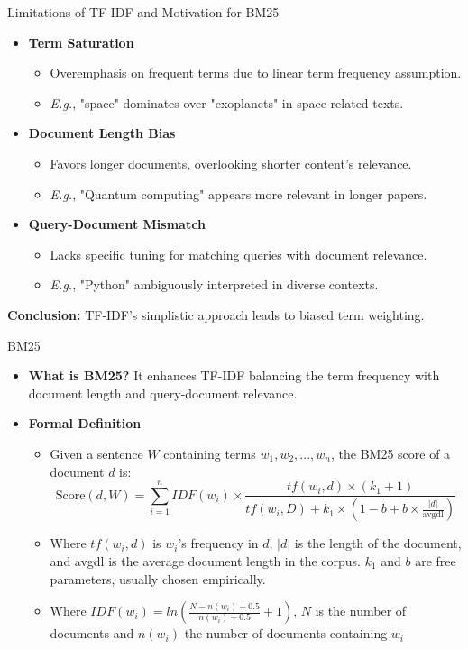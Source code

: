 \documentclass{beamer}
\newenvironment{stepitemize}{\begin{itemize}[<+->]}{\end{itemize} }
\begin{document}
\begin{frame}{Limitations of TF-IDF and Motivation for BM25}
\small
\begin{stepitemize}
\item \textbf{Term Saturation}
\begin{itemize}
  \item Overemphasis on frequent terms due to linear term frequency assumption.
  \item \textit{E.g.}, "space" dominates over "exoplanets" in space-related texts.
\end{itemize}

\item \textbf{Document Length Bias}
\begin{itemize}
  \item Favors longer documents, overlooking shorter content's relevance.
  \item \textit{E.g.}, "Quantum computing" appears more relevant in longer papers.
\end{itemize}

\item \textbf{Query-Document Mismatch}
\begin{itemize}
  \item Lacks specific tuning for matching queries with document relevance.
  \item \textit{E.g.}, "Python" ambiguously interpreted in diverse contexts.
\end{itemize}
\end{stepitemize}
\pause
\textbf{Conclusion:} TF-IDF's simplistic approach leads to biased term weighting.

\end{frame}

\begin{frame}{BM25}
\begin{stepitemize}
\item \textbf{What is BM25?}\newline
It enhances TF-IDF balancing the term frequency with document length and query-document relevance.

\item \textbf{Formal Definition}
\begin{itemize}
  \item Given a sentence \( W \) containing terms \( w_1, w_2, ..., w_n \), the BM25 score of a document \( d \) is:
  \[ \text{Score}(d, W) = \sum_{i=1}^{n} IDF(w_i) \times \frac{tf(w_i, d) \times (k_1 + 1)}{tf(w_i, D) + k_1 \times (1 - b + b \times \frac{|d|}{\text{avgdl}})} \]
  \item Where \( tf(w_i, d) \) is \( w_i \)'s frequency in \( d \), \( |d| \) is the length of the document, and avgdl is the average document length in the corpus. \( k_1 \) and \( b \) are free parameters, usually chosen empirically.
  \item Where \( IDF(w_i) = ln(\frac{N - n(w_i) + 0.5}{n(w_i) + 0.5} + 1)\), \( N \) is the number of documents and \(n(w_i)\) the number of documents containing \(w_i\)
\end{itemize}
\end{stepitemize}
\end{frame}
\end{document}
